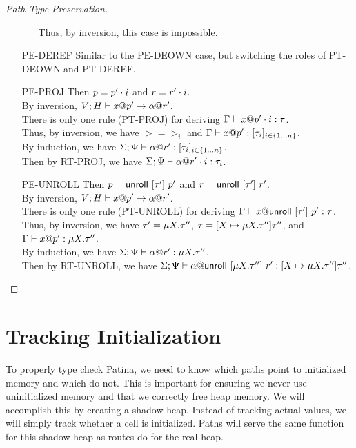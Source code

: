 \begin{proof}[Path Type Preservation]
\begin{itemize}
\begin{itemize}
	  Thus, by inversion, this case is impossible.
      \end{itemize}
    \item[PE-DEREF] 
      Similar to the \textsc{PE-DEOWN} case, but switching the roles of
      \textsc{PT-DEOWN} and \textsc{PT-DEREF}.
    \item[PE-PROJ] Then $p = {p'}\cdot{i}$ and $r = {r'}\cdot{i}$. \\
      By inversion, ${V;H} \vdash {{x}@{p'}} \to {{\alpha}@{r'}}$. \\
      There is only one rule (\textsc{PT-PROJ}) for deriving ${\Gamma} \vdash {{x}@{{p'}\cdot{i}}} : {\tau}$. \\
      Thus, by inversion, we have $\gt = \gt_i$ and ${\Gamma} \vdash {{x}@{p'}} : {[{{\tau}_{i}}]_{{i} \in \{1 \ldots {n}\} }}$. \\
      By induction, we have ${\Sigma;\Psi} \vdash {{\alpha}@{r'}} : {[{{\tau}_{i}}]_{{i} \in \{1 \ldots {n}\} }}$. \\
      Then by \textsc{RT-PROJ}, we have ${\Sigma;\Psi} \vdash {{\alpha}@{{r'}\cdot{i}}} : {\tau_i}$.
    \item[PE-UNROLL] Then $p = \mathsf{unroll}~[{\tau'}]~{p'}$ and $r = \mathsf{unroll}~[{\tau'}]~{r'}$. \\
      By inversion, ${V;H} \vdash {{x}@{p'}} \to {{\alpha}@{r'}}$. \\
      There is only one rule (\textsc{PT-UNROLL}) for deriving
      ${\Gamma} \vdash {{x}@{\mathsf{unroll}~[{\tau'}]~{p'}}} : {\tau}$. \\
      Thus, by inversion, we have $\tau' = \mu {X}.{\tau''}$,
      $\tau = [{X} \mapsto {\mu {X}.{\tau''}}] {\tau''}$, and
      ${\Gamma} \vdash {{x}@{p'}} : {\mu {X}.{\tau''}}$. \\
      By induction, we have ${\Sigma;\Psi} \vdash {{\alpha}@{r'}} : {\mu {X}.{\tau''}}$. \\
      Then by \textsc{RT-UNROLL}, we have
      ${\Sigma;\Psi} \vdash {{\alpha}@{\mathsf{unroll}~[{\mu {X}.{\tau''}}]~{r'}}} : {[{X} \mapsto {\mu {X}.{\tau''}}] {\tau''}}$.
  \end{itemize}
\end{proof}

\section*{Tracking Initialization}
To properly type check Patina, we need to know which paths point to initialized memory
and which do not. This is important for ensuring we never use uninitialized memory and
that we correctly free heap memory.
We will accomplish this by creating a shadow heap.
Instead of tracking actual values, we will simply track whether a cell is initialized.
Paths will serve the same function for this shadow heap as routes do for the real heap.

